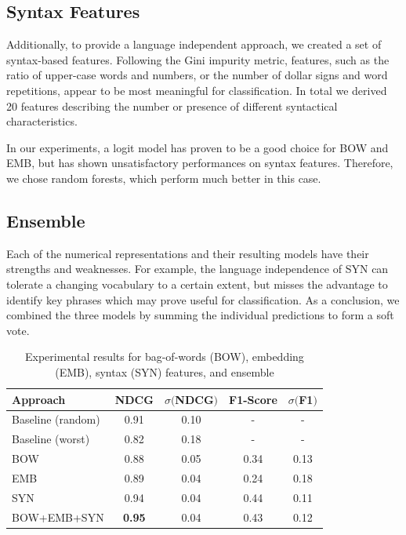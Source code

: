 \subsection{Syntax Features}
Additionally, to provide a language independent approach, we created a set of syntax-based features.
Following the Gini impurity metric, features, such as the ratio of upper-case words and numbers, or the number of dollar signs and word repetitions, appear to be most meaningful for classification.
In total we derived 20 features describing the number or presence of different syntactical characteristics.

In our experiments, a logit model has proven to be a good choice for BOW and EMB, but has shown unsatisfactory performances on syntax features.
Therefore, we chose random forests, which perform much better in this case.

\subsection{Ensemble}
Each of the numerical representations and their resulting models have their strengths and weaknesses.
For example, the language independence of SYN can tolerate a changing vocabulary to a certain extent, but misses the advantage to identify key phrases which may prove useful for classification.
As a conclusion, we combined the three models by summing the individual predictions to form a soft vote.
\begin{table}[tb]
	\caption{Experimental results for bag-of-words (BOW), embedding (EMB), syntax (SYN) features, and ensemble}
	\label{tab:results}
	\begin{tabular}{lcccc}
		\toprule
		Approach & NDCG & $\sigma ($NDCG$)$ & F1-Score &  $\sigma ($F1$)$\\
		\midrule
		Baseline (random) & 0.91 & 0.10 & - & - \\
		Baseline (worst)  & 0.82 & 0.18 & - & - \\
		\midrule
		BOW & 0.88 & 0.05 & 0.34 & 0.13\\
		EMB & 0.89 & 0.04 & 0.24 & 0.18\\
		SYN & 0.94 & 0.04 & 0.44 & 0.11 \\
		BOW+EMB+SYN& \textbf{0.95} & 0.04 & 0.43 & 0.12\\
		\bottomrule
	\end{tabular}
\end{table}
